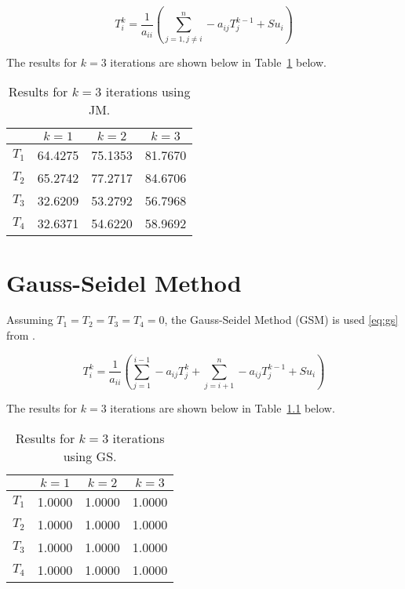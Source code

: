 \begin{equation}
	\label{eq:jacobi}	
	T_i^k = \frac{1}{a_{ii}} \left( \sum_{j=1, j \neq i}^{n} - a_{ij} T_j^{k-1}  + Su_i \right)
\end{equation}

The results for $k=3$ iterations are shown below in Table~\ref{tab:jac} below.

\begin{table}[H]
  \centering
  \caption{Results for $k=3$ iterations using JM.}
    \begin{tabular}{cccc}
    & \textbf{$k=1$} & \textbf{$k=2$} & \textbf{$k=3$} \\
    \midrule
    \textbf{$T_1$} & 64.4275 & 75.1353 & 81.7670 \\
    \textbf{$T_2$} & 65.2742 & 77.2717 & 84.6706 \\
    \textbf{$T_3$} & 32.6209 & 53.2792 & 56.7968 \\
    \textbf{$T_4$} & 32.6371 & 54.6220 & 58.9692 \\
    \end{tabular}
  \label{tab:jac}
\end{table}


\chapter{Gauss-Seidel Method}
\label{chap:gauss}

Assuming $T_1=T_2=T_3=T_4=0$, the Gauss-Seidel Method (GSM) is used \ref{eq:gs} from \cite{cfdbook}.

\begin{equation}
	\label{eq:gs}	
	T_i^k = \frac{1}{a_{ii}} \left( \sum_{j=1}^{i-1} - a_{ij} T_j^k  + \sum_{j=i+1}^{n} - a_{ij} T_j^{k-1} + Su_i \right)
\end{equation}

The results for $k=3$ iterations are shown below in Table~\ref{tab:gs} below.

\begin{table}[H]
  \centering
  \caption{Results for $k=3$ iterations using GS.}
    \begin{tabular}{cccc}
          & $k=1$ & $k=2$ & $k=3$ \\
    \midrule
    $T_1$ & 1.0000 & 1.0000 & 1.0000 \\
    $T_2$ & 1.0000 & 1.0000 & 1.0000 \\
    $T_3$ & 1.0000 & 1.0000 & 1.0000 \\
    $T_4$ & 1.0000 & 1.0000 & 1.0000 \\
    \end{tabular}
  \label{tab:gs}
\end{table}


